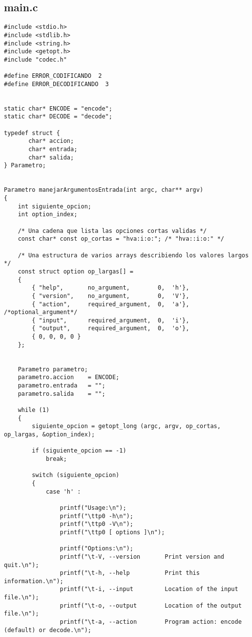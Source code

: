 \documentclass{article}
\begin{document}
\subsection{main.c}
\begin{verbatim}
#include <stdio.h>
#include <stdlib.h>
#include <string.h>
#include <getopt.h>
#include "codec.h"

#define ERROR_CODIFICANDO  2
#define ERROR_DECODIFICANDO  3


static char* ENCODE = "encode";
static char* DECODE = "decode";

typedef struct {
       char* accion;
       char* entrada;
       char* salida;
} Parametro;


Parametro manejarArgumentosEntrada(int argc, char** argv)
{
	int siguiente_opcion;
	int option_index;

    /* Una cadena que lista las opciones cortas validas */
    const char* const op_cortas = "hva:i:o:"; /* "hva::i:o:" */

    /* Una estructura de varios arrays describiendo los valores largos */
    const struct option op_largas[] =
	{
      	{ "help",    	no_argument,  		0,  'h'},
      	{ "version",    no_argument,  		0,  'V'},
		{ "action",    	required_argument,  0,  'a'}, /*optional_argument*/
		{ "input",     	required_argument,  0,  'i'},
		{ "output",    	required_argument,  0,  'o'},
      	{ 0, 0, 0, 0 }
    };


	Parametro parametro;
	parametro.accion 	= ENCODE;
	parametro.entrada 	= "";
	parametro.salida 	= ""; 

    while (1)
    {
        siguiente_opcion = getopt_long (argc, argv, op_cortas, op_largas, &option_index);
        
        if (siguiente_opcion == -1) 
        	break;
        
        switch (siguiente_opcion)
        {
            case 'h' :
            
                printf("Usage:\n");
                printf("\ttp0 -h\n");
                printf("\ttp0 -V\n");
                printf("\ttp0 [ options ]\n");
                
                printf("Options:\n");
                printf("\t-V, --version       Print version and quit.\n");
                printf("\t-h, --help          Print this information.\n");
                printf("\t-i, --input         Location of the input file.\n");
                printf("\t-o, --output        Location of the output file.\n");
                printf("\t-a, --action        Program action: encode (default) or decode.\n");
                

\end{verbatim}
\end{document}

